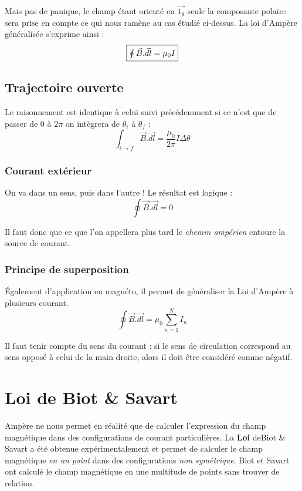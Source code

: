 \documentclass	[11pt, a4paper, openany]{book}
\begin{document}
Mais pas de panique, le champ étant orienté en $\vec{1_\theta}$ seule la composante polaire sera prise en compte ce qui nous ramène au cas étudié ci-dessus. 
La loi d'Ampère généralisée s'exprime ainsi :
\begin{equation}
	\fbox{$\oint \vec{B}.\vec{dl} = \mu_0 I$}
\end{equation}


\subsection{Trajectoire ouverte}
Le raisonnement est identique à celui suivi précédemment si ce n'est que de passer de $0$ à $2\pi$ on intègrera de $\theta_i$ à $\theta_f$ :
\begin{equation}
	\int_{i\rightarrow f} \vec{B}.\vec{dl} = \frac{\mu_0}{2\pi}I\Delta\theta
\end{equation}


\subsubsection{Courant extérieur}
On va dans un sens, puis dans l'autre ! Le résultat est logique :
\begin{equation}
	\oint \vec{B}.\vec{dl} = 0
\end{equation}

Il faut donc que ce que l'on appellera plus tard le \textit{chemin ampérien} entoure la source de courant.

\subsubsection{Principe de superposition}
Également d'application en magnéto, il permet de généraliser la Loi d'Ampère à plusieurs courant.
\begin{equation}
	\oint \vec{B}.\vec{dl} = \mu_0 \sum_{n=1}^N I_n
\end{equation}

Il faut tenir compte du sens du courant : si le sens de circulation correspond au sens opposé à celui de la main droite, alors il doit être considéré comme négatif.

\section{Loi de Biot \& Savart}
Ampère ne nous permet en réalité que de calculer l'expression du champ magnétique dans des configurations de courant particulières. La \textbf{Loi} deBiot \& Savart a été obtenue expérimentalement et permet de calculer le champ magnétique \textit{en un point} dans des configurations \textit{non symétrique}. Biot et Savart ont calculé le champ magnétique en une multitude de points sans trouver de relation. 
\end{document}

